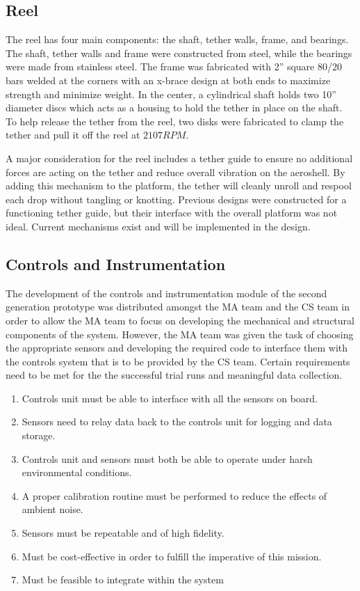 \subsection{Reel}

\indent\indent The reel has four main components: the shaft, tether walls, frame, and bearings. The shaft, tether walls and frame were constructed from steel, while the bearings were made from stainless steel. The frame was fabricated with 2” square 80/20 bars welded at the corners with an x-brace design at both ends to maximize strength and minimize weight. In the center, a cylindrical shaft holds two 10” diameter discs which acts as a housing to hold the tether in place on the shaft. To help release the tether from the reel, two disks were fabricated to clamp the tether and pull it off the reel at $2107 RPM$.

\indent A major consideration for the reel includes a tether guide to ensure no additional forces are
acting on the tether and reduce overall vibration on the aeroshell. By adding this mechanism to the platform, the tether will cleanly unroll and respool each drop without tangling or knotting. Previous designs were constructed for a functioning tether guide, but their interface with the overall platform was not ideal. Current mechanisms exist and will be implemented in the design.

\subsection{Controls and Instrumentation}

\indent\indent The development of the controls and instrumentation module of the second generation prototype was distributed amongst the MA team and the CS team in order to allow the MA team to focus on developing the mechanical and structural components of the system. However, the MA team was given the task of choosing the appropriate sensors and developing the required code to interface them with the controls system that is to be provided by the CS team.
Certain requirements need to be met for the the successful trial runs and meaningful data collection.

\begin{enumerate}
\item Controls unit must be able to interface with all the sensors on board.
\item Sensors need to relay data back to the controls unit for logging and data storage.
\item Controls unit and sensors must both be able to operate under harsh environmental conditions.
\item A proper calibration routine must be performed to reduce the effects of ambient noise.
\item Sensors must be repeatable and of high fidelity.
\item Must be cost-effective in order to fulfill the imperative of this mission.
\item Must be feasible to integrate within the system
\end{enumerate}

